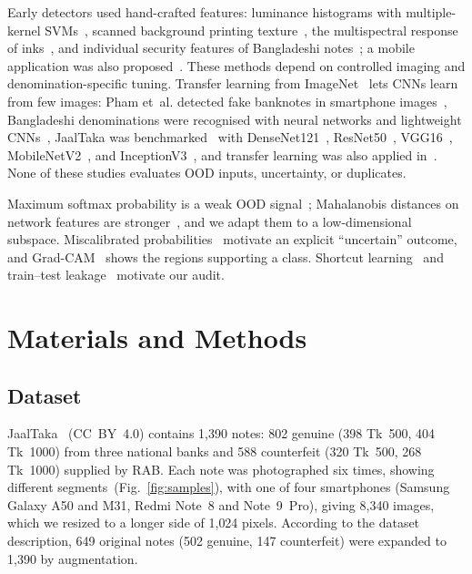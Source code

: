 \documentclass[pdflatex,sn-mathphys-num]{sn-jnl}
\begin{document}
Early detectors used hand-crafted features: luminance histograms with multiple-kernel
SVMs~\cite{yeh2011}, scanned background printing texture~\cite{berenguel2016}, the
multispectral response of inks~\cite{baek2018}, and individual security features of
Bangladeshi notes~\cite{uddin2016}; a mobile application was also
proposed~\cite{dittimi2018}. These methods depend on controlled imaging and
denomination-specific tuning. Transfer learning from
ImageNet~\cite{deng2009imagenet,yosinski2014transferable} lets CNNs learn from few
images: Pham et~al. detected fake banknotes in smartphone images~\cite{pham2020,pham2022},
Bangladeshi denominations were recognised with neural networks and lightweight
CNNs~\cite{jahangir2007,linkon2020}, JaalTaka was benchmarked~\cite{piyas2025jaaltaka}
with DenseNet121~\cite{huang2017densenet}, ResNet50~\cite{he2016resnet},
VGG16~\cite{simonyan2015vgg}, MobileNetV2~\cite{sandler2018mobilenetv2}, and
InceptionV3~\cite{szegedy2016inception}, and transfer learning was also applied
in~\cite{tabassum2025}. None of these studies evaluates OOD inputs, uncertainty, or
duplicates.

Maximum softmax probability is a weak OOD signal~\cite{hendrycks2017baseline};
Mahalanobis distances on network features are stronger~\cite{lee2018mahalanobis}, and we
adapt them to a low-dimensional subspace. Miscalibrated
probabilities~\cite{guo2017calibration} motivate an explicit ``uncertain'' outcome, and
Grad-CAM~\cite{selvaraju2017gradcam} shows the regions supporting a class. Shortcut
learning~\cite{geirhos2020shortcut} and train--test leakage~\cite{kapoor2023leakage}
motivate our audit.

\section{Materials and Methods}\label{sec:method}

\subsection{Dataset}\label{sec:data}

JaalTaka~\cite{piyas2025jaaltaka,jaaltaka_data} (CC~BY~4.0) contains 1{,}390 notes:
802 genuine (398 Tk~500, 404 Tk~1000) from three national banks and 588 counterfeit
(320 Tk~500, 268 Tk~1000) supplied by RAB. Each note was photographed six times, showing
different segments~(Fig.~\ref{fig:samples}), with one of four smartphones (Samsung Galaxy
A50 and M31, Redmi Note~8 and Note~9~Pro), giving 8{,}340 images, which we resized to a
longer side of 1{,}024 pixels. According to the dataset description, 649 original notes
(502 genuine, 147 counterfeit) were expanded to 1{,}390 by augmentation.
\end{document}

